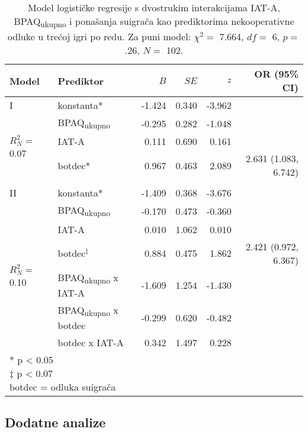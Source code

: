 \documentclass[a4paper, 12pt]{report}
\begin{document}
\begin{table}
    \begin{center}
        \caption{\label{glmtotgam33} Model logističke regresije s dvostrukim
            interakcijama IAT-A,
            BPAQ\textsubscript{ukupno} i ponašanja suigrača kao prediktorima
            nekooperativne odluke u trećoj igri po redu. Za puni
            model: $\chi^2 =$
            7.664, $df =$ 6, $p =$ .26, $N =$ 102.}
        \hspace*{-0.5cm}\begin{tabular}{llrrrr}
        \toprule
        Model & Prediktor & $B$ & $SE$ & $z$ & OR (95\% CI)\\
        \midrule
        I & konstanta* & -1.424 & 0.340 & -3.962 &\\
        \multirow{3}{*}{$R^2_N =$ 0.07}
        &BPAQ\textsubscript{ukupno} & -0.295 & 0.282 & -1.048 &\\
        &IAT-A & 0.111 & 0.690 & 0.161 &\\
        &botdec* & 0.967 & 0.463 & 2.089 & 2.631 (1.083, 6.742)\\
        &&&&&\\ 
        II & konstanta* & -1.409 & 0.368 & -3.676 & \\
        \multirow{6}{*}{$R^2_N =$ 0.10}
        &BPAQ\textsubscript{ukupno} & -0.170 & 0.473 & -0.360 & \\
        &IAT-A & 0.010 & 1.062 & 0.010 &\\
        &botdec$^\ddagger$ & 0.884 & 0.475 & 1.862  & 2.421 (0.972, 6.367)\\
        &BPAQ\textsubscript{ukupno} x IAT-A & -1.609 & 1.254 & -1.430 & \\
        &BPAQ\textsubscript{ukupno} x botdec & -0.299 & 0.620 & -0.482 & \\
        &botdec x IAT-A & 0.342 & 1.497 & 0.228 & \\
        \bottomrule
        \multicolumn{5}{l}{
            \parbox{3cm}{\scriptsize \vspace{3pt} 
                * p < 0.05\\
                $\ddagger$  p < 0.07\\
                botdec = odluka suigrača
        }}
    \end{tabular}
\end{center}
\end{table}

\subsection{Dodatne analize}
\end{document}
